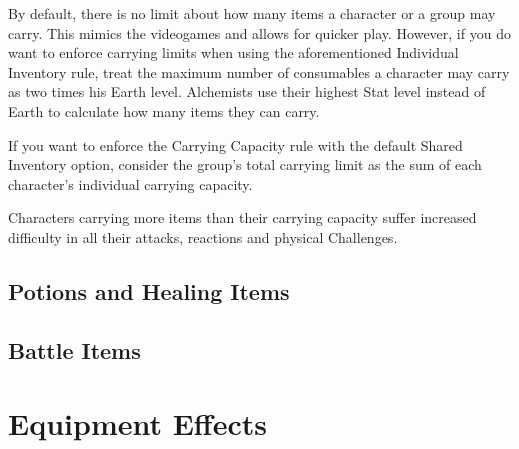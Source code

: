 \begin{multicols}{2}
\begin{boco}
By default, there is no limit about how many items a character or a group may carry. This mimics the videogames and allows for quicker play. However, if you do want to enforce carrying limits when using the aforementioned Individual Inventory rule, treat the maximum number of consumables a character may carry as two times his Earth level. Alchemists use their highest Stat level instead of Earth to calculate how many items they can carry. \pc%

If you want to enforce the Carrying Capacity rule with the default Shared Inventory option, consider the group's total carrying limit as the sum of each character's individual carrying capacity. \pc%

Characters carrying more items than their carrying capacity suffer increased difficulty in all their attacks, reactions and physical Challenges.

\end{boco}

\end{multicols}

\clearpage
\subsection{Potions and Healing Items}\label{subsec:potions}

\begin{tabitem}[label=inv-potions]
    
\end{tabitem}
\begin{center}
\end{center}
\clearpage
\subsection{Battle Items}\label{subsec:battleitems}

\begin{tabitem}[label=inv-battles]
    
\end{tabitem}
\begin{center}
\end{center}
\clearpage
\section{Equipment Effects}\label{sec:equipeffects}


